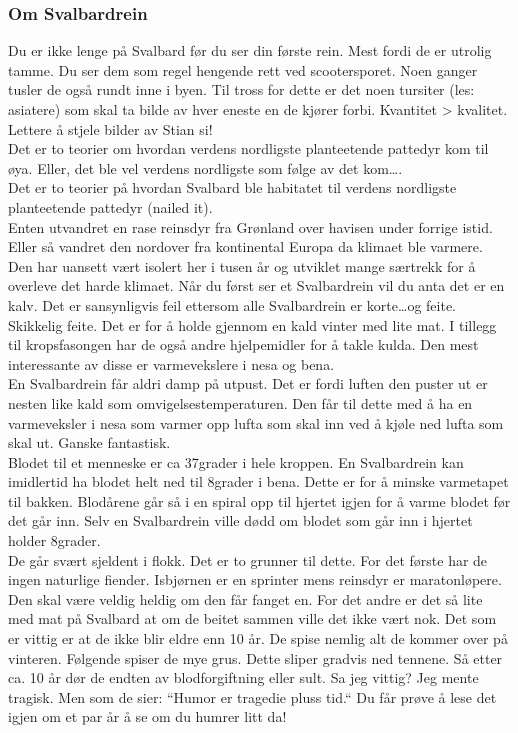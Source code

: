 \subsubsection{Om Svalbardrein}

Du er ikke lenge på Svalbard før du ser din første rein. Mest fordi
de er utrolig tamme. Du ser dem som regel hengende rett ved
scootersporet. Noen ganger tusler de også rundt inne i byen. Til tross
for dette er det noen tursiter (les: asiatere) som skal ta bilde av
hver eneste en de kjører forbi. Kvantitet > kvalitet. Lettere å stjele
bilder av Stian si!\\

Det er to teorier om hvordan verdens nordligste planteetende pattedyr
 kom til øya. Eller, det ble vel verdens nordligste som følge av det
 kom\ldots. \\
 Det er to teorier på hvordan Svalbard ble habitatet til verdens
 nordligste planteetende pattedyr (nailed it).
 \\
 Enten utvandret en rase reinsdyr fra Grønland over havisen under
forrige istid. Eller så vandret den nordover fra kontinental
Europa da klimaet ble varmere. Den har uansett vært isolert her i
tusen år og utviklet mange særtrekk for å overleve det harde klimaet.
Når du først ser et Svalbardrein vil du anta det er en kalv. Det
er sansynligvis feil ettersom alle Svalbardrein er korte\ldots og feite.
Skikkelig feite. Det er for å holde gjennom en kald vinter med lite
mat. I tillegg til kropsfasongen har de også andre hjelpemidler for å
takle kulda. Den mest interessante av disse er varmevekslere i nesa og
bena.\\

En Svalbardrein får aldri damp på utpust. Det er fordi
luften den puster ut er nesten like kald som omvigelsestemperaturen.
Den får til dette med å ha en varmeveksler i nesa som varmer opp lufta
som skal inn ved å kjøle ned lufta som skal ut. Ganske fantastisk.\\

Blodet til et menneske
er ca 37grader i hele kroppen. En Svalbardrein kan imidlertid ha
blodet helt ned til 8grader i bena. Dette er for å minske varmetapet
til bakken. Blodårene går så i en spiral opp til hjertet igjen for å
varme blodet før det går inn. Selv en Svalbardrein ville dødd om blodet
som går inn i hjertet holder 8grader. \\

De går svært sjeldent i flokk. Det er to grunner til dette. For det
første har de ingen naturlige fiender. Isbjørnen er en sprinter mens
reinsdyr er maratonløpere. Den skal være veldig heldig om den får
fanget en. For det andre er det så lite med mat på Svalbard at om de
beitet sammen ville det ikke vært nok. Det som er vittig er at de ikke
blir eldre enn 10 år. De spise nemlig alt de kommer over på vinteren.
Følgende spiser de mye grus. Dette sliper gradvis ned tennene. Så
etter ca. 10 år dør de endten av blodforgiftning eller sult. Sa jeg
vittig? Jeg mente tragisk. Men som de sier: ``Humor er tragedie pluss
tid.`` Du får prøve å lese det igjen om et par år å se om du humrer
litt da!\\

